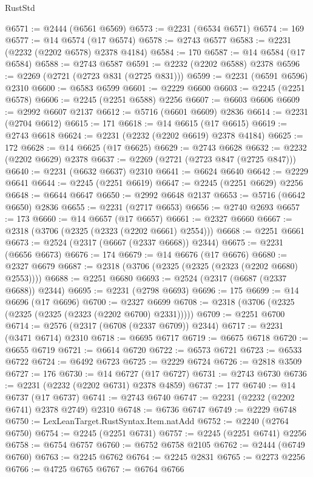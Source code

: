\begin{lexlean}{RustStd}
\begin{coremodule}
@6571 := @2444 (@6561 @6569)
@6573 := @2231 (@6534 @6571)
@6574 := 169
@6577 := @14 @6574 (@17 @6574)
@6578 := @2743 @6577
@6583 := @2231 (@2232 (@2202 @6578) @2378 @4184)
@6584 := 170
@6587 := @14 @6584 (@17 @6584)
@6588 := @2743 @6587
@6591 := @2232 (@2202 @6588) @2378
@6596 := @2269 (@2721 (@2723 @831 (@2725 @831)))
@6599 := @2231 (@6591 @6596) @2310
@6600 := @6583 @6599
@6601 := @2229 @6600
@6603 := @2245 (@2251 @6578)
@6606 := @2245 (@2251 @6588) @2256
@6607 := @6603 @6606
@6609 := @2992 @6607 @2137
@6612 := @5716 (@6601 @6609) @2836
@6614 := @2231 (@2704 @6612)
@6615 := 171
@6618 := @14 @6615 (@17 @6615)
@6619 := @2743 @6618
@6624 := @2231 (@2232 (@2202 @6619) @2378 @4184)
@6625 := 172
@6628 := @14 @6625 (@17 @6625)
@6629 := @2743 @6628
@6632 := @2232 (@2202 @6629) @2378
@6637 := @2269 (@2721 (@2723 @847 (@2725 @847)))
@6640 := @2231 (@6632 @6637) @2310
@6641 := @6624 @6640
@6642 := @2229 @6641
@6644 := @2245 (@2251 @6619)
@6647 := @2245 (@2251 @6629) @2256
@6648 := @6644 @6647
@6650 := @2992 @6648 @2137
@6653 := @5716 (@6642 @6650) @2836
@6655 := @2231 (@2717 @6653)
@6656 := @2740 @2693
@6657 := 173
@6660 := @14 @6657 (@17 @6657)
@6661 := @2327 @6660
@6667 := @2318 (@3706 (@2325 (@2323 (@2202 @6661) @2554)))
@6668 := @2251 @6661
@6673 := @2524 (@2317 (@6667 (@2337 @6668)) @2344)
@6675 := @2231 (@6656 @6673)
@6676 := 174
@6679 := @14 @6676 (@17 @6676)
@6680 := @2327 @6679
@6687 := @2318 (@3706 (@2325 (@2325 (@2323 (@2202 @6680) @2553))))
@6688 := @2251 @6680
@6693 := @2524 (@2317 (@6687 (@2337 @6688)) @2344)
@6695 := @2231 (@2798 @6693)
@6696 := 175
@6699 := @14 @6696 (@17 @6696)
@6700 := @2327 @6699
@6708 := @2318 (@3706 (@2325 (@2325 (@2325 (@2323 (@2202 @6700) @2331)))))
@6709 := @2251 @6700
@6714 := @2576 (@2317 (@6708 (@2337 @6709)) @2344)
@6717 := @2231 (@3471 @6714) @2310
@6718 := @6695 @6717
@6719 := @6675 @6718
@6720 := @6655 @6719
@6721 := @6614 @6720
@6722 := @6573 @6721
@6723 := @6533 @6722
@6724 := @6492 @6723
@6725 := @2229 @6724
@6726 := @2818 @3509
@6727 := 176
@6730 := @14 @6727 (@17 @6727)
@6731 := @2743 @6730
@6736 := @2231 (@2232 (@2202 @6731) @2378 @4859)
@6737 := 177
@6740 := @14 @6737 (@17 @6737)
@6741 := @2743 @6740
@6747 := @2231 (@2232 (@2202 @6741) @2378 @2749) @2310
@6748 := @6736 @6747
@6749 := @2229 @6748
@6750 := LexLeanTarget.RustSyntax.Item.natAdd
@6752 := @2240 (@2764 @6750)
@6754 := @2245 (@2251 @6731)
@6757 := @2245 (@2251 @6741) @2256
@6758 := @6754 @6757
@6760 := @6752 @6758 @2105
@6762 := @2444 (@6749 @6760)
@6763 := @2245 @6762
@6764 := @2245 @2831
@6765 := @2273 @2256
@6766 := @4725 @6765
@6767 := @6764 @6766

\end{coremodule}
\end{lexlean}
